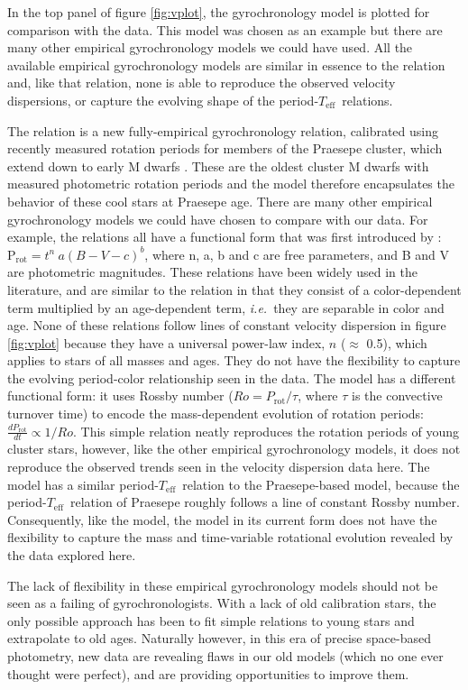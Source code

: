 \documentclass{aastex63}
\newcommand{\ie}{{\it i.e.}}
\newcommand{\teff}{$T_{\mathrm{eff}}$}
\newcommand{\racomment}[1]{{\color{blue}#1}}
\begin{document}
\racomment{
In the top panel of figure \ref{fig:vplot}, the \citet{angus2019}
gyrochronology model is plotted for comparison with the data.
This model was chosen as an example but there are many other empirical
gyrochronology models we could have used.
All the available empirical gyrochronology models are similar in essence to
the \citet{angus2019} relation and, like that relation, none is able to
reproduce the observed velocity dispersions, or capture the evolving shape of
the period-\teff\ relations.

The \citet{angus2019} relation is a new fully-empirical gyrochronology
relation, calibrated using recently measured rotation periods for members of
the Praesepe cluster, which extend down to early M dwarfs \citep{rebull2017,
douglas2017}.
These are the oldest cluster M dwarfs with measured photometric rotation
periods and the \citet{angus2019} model therefore encapsulates the behavior of
these cool stars at Praesepe age.
There are many other empirical gyrochronology models we could have chosen to
compare with our data.
For example, the \citet{barnes2003, barnes2007, mamajek2008, meibom2011,
angus2015} relations all have a functional form that was first introduced by
\citet{barnes2003}: $\mathrm{P_{rot}} = t^n~a(B-V - c)^b$, where n, a, b and c
are free parameters, and B and V are photometric magnitudes.
These relations have been widely used in the literature, and are similar to
the \citet{angus2019} relation in that they consist of a color-dependent term
multiplied by an age-dependent term, \ie\ they are separable in color and age.
None of these relations follow lines of constant velocity dispersion in figure
\ref{fig:vplot} because they have a universal power-law index, $n$ ($\approx$
0.5), which applies to stars of all masses and ages.
They do not have the flexibility to capture the evolving period-color
relationship seen in the data.
The \citet{barnes2010} model has a different functional form: it uses Rossby
number ($Ro = P_\mathrm{rot}/\tau$, where $\tau$ is the convective turnover
time) to encode the mass-dependent evolution of rotation periods:
$\frac{dP_\mathrm{rot}}{dt} \propto 1/Ro$.
This simple relation neatly reproduces the rotation periods of young cluster
stars, however, like the other empirical gyrochronology models, it does not
reproduce the observed trends seen in the velocity dispersion data here.
The \citet{barnes2010} model has a similar period-\teff\ relation to the
Praesepe-based \citet{angus2019} model, because the period-\teff\ relation of
Praesepe roughly follows a line of constant Rossby number.
Consequently, like the \citet{angus2019} model, the \citet{barnes2010} model
in its current form does not have the flexibility to capture the mass and
time-variable rotational evolution revealed by the data explored here.

The lack of flexibility in these empirical gyrochronology models should not be
seen as a failing of gyrochronologists.
With a lack of old calibration stars, the only possible approach has been to
fit simple relations to young stars and extrapolate to old ages.
Naturally however, in this era of precise space-based photometry, new data are
revealing flaws in our old models (which no one ever thought were perfect),
and are providing opportunities to improve them.
}
\end{document}
